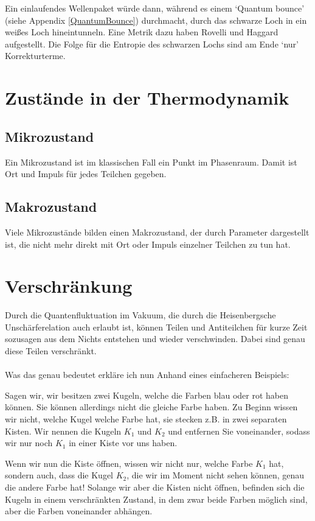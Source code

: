 \documentclass[ngerman]{scrartcl}
\begin{document}
Ein einlaufendes Wellenpaket würde dann, während es einem `Quantum bounce' (siehe Appendix
\ref{QuantumBounce}) durchmacht, durch das schwarze Loch in ein weißes Loch hineintunneln. Eine Metrik dazu haben Rovelli und Haggard \cite{LQGRovelli} aufgestellt. Die Folge für die Entropie des schwarzen Lochs sind am Ende `nur' Korrekturterme.


\appendix
\section{Zustände in der Thermodynamik}

\subsection*{Mikrozustand}
Ein Mikrozustand ist im klassischen Fall ein Punkt im Phasenraum. Damit ist Ort und Impuls für jedes Teilchen gegeben.

\subsection*{Makrozustand}
Viele Mikrozustände bilden einen Makrozustand, der durch Parameter dargestellt ist, die nicht mehr direkt mit Ort oder Impuls einzelner Teilchen zu tun hat.

\section{Verschränkung} \label{Verschränkung}
	Durch die Quantenfluktuation im Vakuum, die durch die Heisenbergsche Unschärferelation auch erlaubt ist, können Teilen und Antiteilchen für kurze Zeit sozusagen aus dem Nichts entstehen und wieder verschwinden. Dabei sind genau diese Teilen verschränkt.
	\\ \\
	Was das genau bedeutet erkläre ich nun Anhand eines einfacheren Beispiels:
	
	Sagen wir, wir besitzen zwei Kugeln, welche die Farben blau oder rot haben können. Sie können allerdings nicht die gleiche Farbe haben. 
	Zu Beginn wissen wir nicht, welche Kugel welche Farbe hat, sie stecken z.B. in zwei separaten Kisten. Wir nennen die Kugeln $K_1$ und $K_2$ und entfernen Sie voneinander, sodass wir nur noch $K_1$ in einer Kiste vor uns haben. 
	
	Wenn wir nun die Kiste öffnen, wissen wir nicht nur, welche Farbe $K_1$ hat, sondern auch, dass die Kugel $K_2$, die wir im Moment nicht sehen können, genau die andere Farbe hat! 
	Solange wir aber die Kisten nicht öffnen, befinden sich die Kugeln in einem verschränkten Zustand, in dem zwar beide Farben möglich sind, aber die Farben voneinander abhängen. 
	
\end{document}
